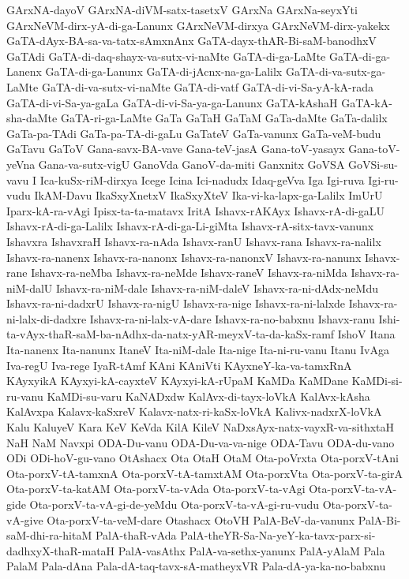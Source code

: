 {GArxNA-dayoV
GArxNA-diVM-satx-tasetxV
GArxNa
GArxNa-seyxYti
GArxNeVM-dirx-yA-di-ga-Lanunx
GArxNeVM-dirxya
GArxNeVM-dirx-yakekx
GaTA-dAyx-BA-sa-va-tatx-sAmxnAnx
GaTA-dayx-thAR-Bi-saM-banodhxV
GaTAdi
GaTA-di-daq-shayx-va-sutx-vi-naMte
GaTA-di-ga-LaMte
GaTA-di-ga-Lanenx
GaTA-di-ga-Lanunx
GaTA-di-jAcnx-na-ga-Lalilx
GaTA-di-va-sutx-ga-LaMte
GaTA-di-va-sutx-vi-naMte
GaTA-di-vatf
GaTA-di-vi-Sa-yA-kA-rada
GaTA-di-vi-Sa-ya-gaLa
GaTA-di-vi-Sa-ya-ga-Lanunx
GaTA-kAshaH
GaTA-kA-sha-daMte
GaTA-ri-ga-LaMte
GaTa
GaTaH
GaTaM
GaTa-daMte
GaTa-dalilx
GaTa-pa-TAdi
GaTa-pa-TA-di-gaLu
GaTateV
GaTa-vanunx
GaTa-veM-budu
GaTavu
GaToV
Gana-savx-BA-vave
Gana-teV-jasA
Gana-toV-yasayx
Gana-toV-yeVna
Gana-va-sutx-vigU
GanoVda
GanoV-da-miti
Ganxnitx
GoVSA
GoVSi-su-vavu
I
Ica-kuSx-riM-dirxya
Icege
Icina
Ici-nadudx
Idaq-geVva
Iga
Igi-ruva
Igi-ru-vudu
IkAM-Davu
IkaSxyXnetxV
IkaSxyXteV
Ika-vi-ka-lapx-ga-Lalilx
ImUrU
Iparx-kA-ra-vAgi
Ipisx-ta-ta-matavx
IritA
Ishavx-rAKAyx
Ishavx-rA-di-gaLU
Ishavx-rA-di-ga-Lalilx
Ishavx-rA-di-ga-Li-giMta
Ishavx-rA-sitx-tavx-vanunx
Ishavxra
IshavxraH
Ishavx-ra-nAda
Ishavx-ranU
Ishavx-rana
Ishavx-ra-nalilx
Ishavx-ra-nanenx
Ishavx-ra-nanonx
Ishavx-ra-nanonxV
Ishavx-ra-nanunx
Ishavx-rane
Ishavx-ra-neMba
Ishavx-ra-neMde
Ishavx-raneV
Ishavx-ra-niMda
Ishavx-ra-niM-dalU
Ishavx-ra-niM-dale
Ishavx-ra-niM-daleV
Ishavx-ra-ni-dAdx-neMdu
Ishavx-ra-ni-dadxrU
Ishavx-ra-nigU
Ishavx-ra-nige
Ishavx-ra-ni-lalxde
Ishavx-ra-ni-lalx-di-dadxre
Ishavx-ra-ni-lalx-vA-dare
Ishavx-ra-no-babxnu
Ishavx-ranu
Ishi-ta-vAyx-thaR-saM-ba-nAdhx-da-natx-yAR-meyxV-ta-da-kaSx-ramf
IshoV
Itana
Ita-nanenx
Ita-nanunx
ItaneV
Ita-niM-dale
Ita-nige
Ita-ni-ru-vanu
Itanu
IvAga
Iva-regU
Iva-rege
IyaR-tAmf
KAni
KAniVti
KAyxneY-ka-va-tamxRnA
KAyxyikA
KAyxyi-kA-cayxteV
KAyxyi-kA-rUpaM
KaMDa
KaMDane
KaMDi-si-ru-vanu
KaMDi-su-varu
KaNADxdw
KalAvx-di-tayx-loVkA
KalAvx-kAsha
KalAvxpa
Kalavx-kaSxreV
Kalavx-natx-ri-kaSx-loVkA
Kalivx-nadxrX-loVkA
Kalu
KaluyeV
Kara
KeV
KeVda
KilA
KileV
NaDxsAyx-natx-vayxR-va-sithxtaH
NaH
NaM
Navxpi
ODA-Du-vanu
ODA-Du-va-va-nige
ODA-Tavu
ODA-du-vano
ODi
ODi-hoV-gu-vano
OtAshacx
Ota
OtaH
OtaM
Ota-poVrxta
Ota-porxV-tAni
Ota-porxV-tA-tamxnA
Ota-porxV-tA-tamxtAM
Ota-porxVta
Ota-porxV-ta-girA
Ota-porxV-ta-katAM
Ota-porxV-ta-vAda
Ota-porxV-ta-vAgi
Ota-porxV-ta-vA-gide
Ota-porxV-ta-vA-gi-de-yeMdu
Ota-porxV-ta-vA-gi-ru-vudu
Ota-porxV-ta-vA-give
Ota-porxV-ta-veM-dare
Otashacx
OtoVH
PalA-BeV-da-vanunx
PalA-Bi-saM-dhi-ra-hitaM
PalA-thaR-vAda
PalA-theYR-Sa-Na-yeY-ka-tavx-parx-si-dadhxyX-thaR-mataH
PalA-vasAthx
PalA-va-sethx-yanunx
PalA-yAlaM
Pala
PalaM
Pala-dAna
Pala-dA-taq-tavx-sA-matheyxVR
Pala-dA-ya-ka-no-babxnu
}

